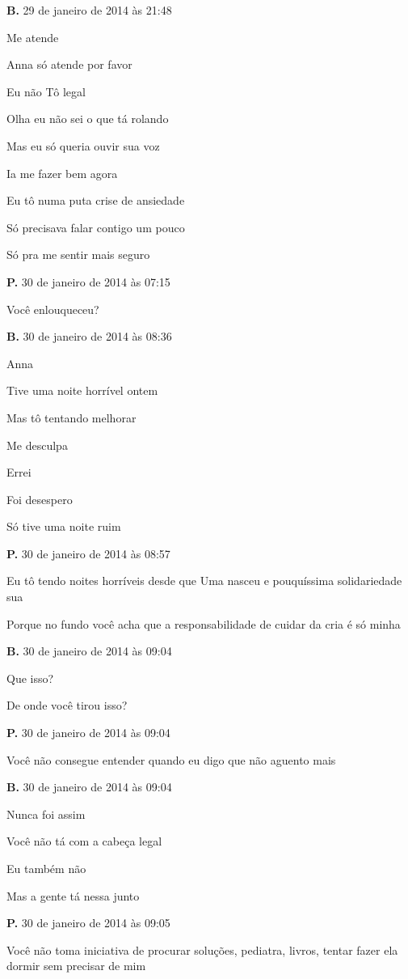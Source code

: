 \textbf{B.} 29 de janeiro de 2014 às 21:48

Me atende

Anna só atende por favor

Eu não Tô legal

Olha eu não sei o que tá rolando

Mas eu só queria ouvir sua voz

Ia me fazer bem agora

Eu tô numa puta crise de ansiedade

Só precisava falar contigo um pouco

Só pra me sentir mais seguro

\textbf{P.} 30 de janeiro de 2014 às 07:15

Você enlouqueceu?

\textbf{B.} 30 de janeiro de 2014 às 08:36

Anna

Tive uma noite horrível ontem

Mas tô tentando melhorar

Me desculpa

Errei

Foi desespero

Só tive uma noite ruim

\textbf{P.} 30 de janeiro de 2014 às 08:57

Eu tô tendo noites horríveis desde que Uma nasceu e pouquíssima
solidariedade sua

Porque no fundo você acha que a responsabilidade de cuidar da cria é só
minha

\textbf{B.} 30 de janeiro de 2014 às 09:04

Que isso?

De onde você tirou isso?

\textbf{P.} 30 de janeiro de 2014 às 09:04

Você não consegue entender quando eu digo que não aguento mais

\textbf{B.} 30 de janeiro de 2014 às 09:04

Nunca foi assim

Você não tá com a cabeça legal

Eu também não

Mas a gente tá nessa junto

\textbf{P.} 30 de janeiro de 2014 às 09:05

Você não toma iniciativa de procurar soluções, pediatra, livros, tentar
fazer ela dormir sem precisar de mim

